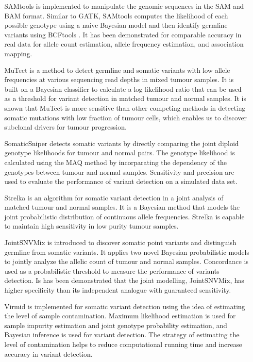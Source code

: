 \documentclass[11pt,reqno]{amsart}
\begin{document}
SAMtools \citep{Li2009a} is implemented to manipulate the genomic sequences in the SAM and BAM format.
Similar to GATK, SAMtools computes the likelihood of each possible genotype using a naive Bayesian model and then identify germline variants using BCFtools \citep{li2011statistical}.
It has been demonstrated for comparable accuracy in real data for allele count estimation, allele frequency estimation, and association mapping.

MuTect \citep{Cibulskis2013} is a method to detect germline and somatic variants with low allele frequencies at various sequencing read depths in mixed tumour samples.
It is built on a Bayesian classifier to calculate a log-likelihood ratio that can be used as a threshold for variant detection in matched tumour and normal samples.
It is shown that MuTect is more sensitive than other competing methods in detecting somatic mutations with low fraction of tumour cells, which enables us to discover subclonal drivers for tumour progression.

SomaticSniper \citep{Larson2012} detects somatic variants by directly comparing the joint diploid genotype likelihoods for tumour and normal pairs.
The genotype likelihood is calculated using the MAQ method \citep{Li2008} by  incorparating the dependency of the genotypes between tumour and normal samples.
Sensitivity and precision are used to evaluate the performance of variant detection on a simulated data set.

Strelka \citep{Saunders2012} is an algorithm for somatic variant detection in a joint analysis of matched tumour and normal samples.
It is a Bayesian method that models the joint probabilistic distribution of continuous allele frequencies.
Strelka is capable to maintain high sensitivity in low purity tumour samples.

JointSNVMix \citep{Roth2012} is introduced to discover somatic point variants and distinguish germline from somatic variants.
It applies two novel Bayesian probabilistic models to jointly analyze the allelic count of tumour and normal samples.
Concordance is used as a probabilistic threshold to measure the performance of variants detection.
Is has been demonstrated that the joint modelling, JointSNVMix, has higher specificity than its independent analogue with guaranteed sensitivity.

Virmid \citep{Kim2013} is implemented for somatic variant detection using the idea of estimating the level of sample contamination.
Maximum likelihood estimation is used for sample impurity estimation and joint genotype probability estimation, and Bayesian inference is used for variant detection.
The strategy of estimating the level of contamination helps to reduce computational running time and increase accuracy in variant detection.
\end{document}
